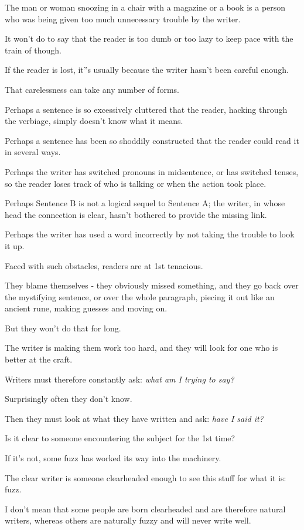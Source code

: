 \documentclass{book}
\numberwithin{equation}{section}
\begin{document}
The man or woman snoozing in a chair with a magazine or a book is a person who was being given too much unnecessary trouble by the writer.

%
It won't do to say that the reader is too dumb or too lazy to keep pace with the train of though.

If the reader is lost, it''s usually because the writer hasn't been careful enough.

That carelessness can take any number of forms.

Perhaps a sentence is so excessively cluttered that the reader, hacking through the verbiage, simply doesn't know what it means.

Perhaps a sentence has been so shoddily constructed that the reader could read it in several ways.

Perhaps the writer has switched pronouns in midsentence, or has switched tenses, so the reader loses track of who is talking or when the action took place.

Perhaps Sentence B is not a logical sequel to Sentence A; the writer, in whose head the connection is clear, hasn't bothered to provide the missing link.

Perhaps the writer has used a word incorrectly by not taking the trouble to look it up.

Faced with such obstacles, readers are at 1st tenacious.

They blame themselves - they obviously missed something, and they go back over the mystifying sentence, or over the whole paragraph, piecing it out like an ancient rune, making guesses and moving on.

But they won't do that for long.

The writer is making them work too hard, and they will look for one who is better at the craft.

%
Writers must therefore constantly ask: \textit{what am I trying to say?}

Surprisingly often they don't know.

Then they must look at what they have written and ask: \textit{have I said it?}

Is it clear to someone encountering the subject for the 1st time?

If it's not, some fuzz has worked its way into the machinery.

The clear writer is someone clearheaded enough to see this stuff for what it is: fuzz.

%
I don't mean that some people are born clearheaded and are therefore natural writers, whereas others are naturally fuzzy and will never write well.
\end{document}
